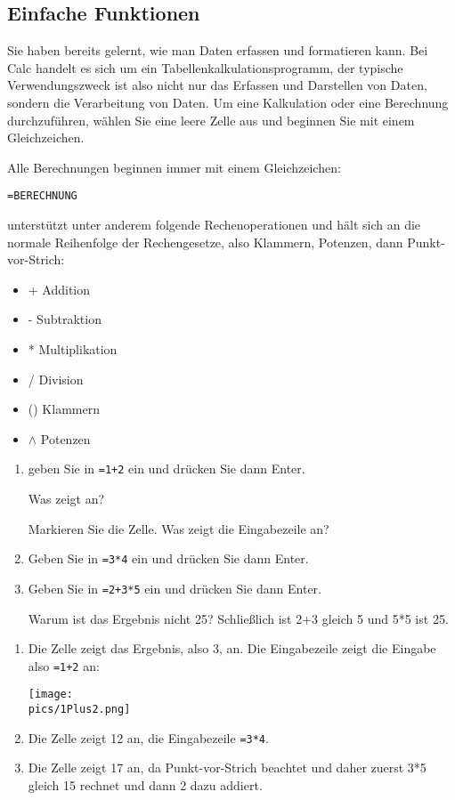 \subsection{Einfache Funktionen}
Sie haben bereits gelernt, wie man Daten erfassen und formatieren kann. Bei Calc handelt es sich um ein Tabellenkalkulationsprogramm, der typische Verwendungszweck ist also nicht nur das Erfassen und Darstellen von Daten, sondern die Verarbeitung von Daten. Um eine Kalkulation oder eine Berechnung durchzuführen, wählen Sie eine leere Zelle aus und beginnen Sie mit einem Gleichzeichen.
\begin{tcolorbox}
    Alle Berechnungen beginnen immer mit einem Gleichzeichen:

    \lstinline|=BERECHNUNG|
\end{tcolorbox}
\Calc unterstützt unter anderem folgende Rechenoperationen und hält sich an die normale Reihenfolge der Rechengesetze, also Klammern, Potenzen, dann Punkt-vor-Strich:
\begin{itemize}
    \item + Addition
    \item - Subtraktion
    \item * Multiplikation
    \item / Division
    \item () Klammern
    \item \(\wedge\) Potenzen
\end{itemize}
\begin{Exercise}[title={Öffnen Sie Calc und\dots}, label=EinfacheBerechnungen]
    \begin{enumerate}
        \item geben Sie in  \lstinline|=1+2| ein und drücken Sie dann Enter.

        Was zeigt \Calc an?

        Markieren Sie die Zelle. Was zeigt die Eingabezeile an?
        \item Geben Sie in  \lstinline|=3*4| ein und drücken Sie dann Enter.
        \item Geben Sie in  \lstinline|=2+3*5| ein und drücken Sie dann Enter.

        Warum ist das Ergebnis nicht 25? Schließlich ist 2+3 gleich 5 und 5*5 ist 25.
    \end{enumerate}
\end{Exercise}
\begin{Answer}[ref=EinfacheBerechnungen]
    \begin{enumerate}
        \item Die Zelle zeigt das Ergebnis, also 3, an. Die Eingabezeile zeigt die Eingabe also \lstinline|=1+2| an:

        \texttt{[image: \\pics/1Plus2.png]}
        \item Die Zelle zeigt 12 an, die Eingabezeile \lstinline|=3*4|.
        \item Die Zelle zeigt 17 an, da \Calc Punkt-vor-Strich beachtet und daher zuerst 3*5 gleich 15 rechnet und dann 2 dazu addiert.
    \end{enumerate}
\end{Answer}